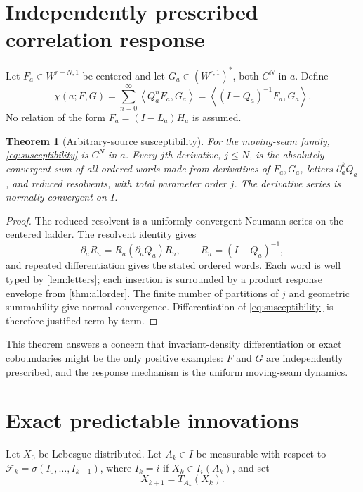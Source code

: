 \documentclass[11pt,reqno]{amsart}
\newtheorem{theorem}{Theorem}[section]
\theoremstyle{definition}
\theoremstyle{remark}
\newcommand{\F}{\mathcal F}
\newcommand{\pair}[2]{\left\langle #1,#2\right\rangle}
\begin{document}
\section{Independently prescribed correlation response}

Let $F_a\in W^{r+N,1}$ be centered and let
$G_a\in(W^{r,1})^*$, both $C^N$ in $a$.  Define
\begin{equation}\label{eq:susceptibility}
 \chi(a;F,G)=
 \sum_{n=0}^\infty\pair{Q_a^nF_a}{G_a}
 =\pair{(I-Q_a)^{-1}F_a}{G_a}.
\end{equation}
No relation of the form $F_a=(I-L_a)H_a$ is assumed.

\begin{theorem}[Arbitrary-source susceptibility]\label{thm:correlation}
For the moving-seam family, \eqref{eq:susceptibility} is $C^N$ in $a$.  Every
$j$th derivative, $j\le N$, is the absolutely convergent sum of all ordered
words made from derivatives of $F_a,G_a$, letters
$\partial_a^kQ_a$, and reduced resolvents, with total parameter order $j$.
The derivative series is normally convergent on $I$.
\end{theorem}

\begin{proof}
The reduced resolvent is a uniformly convergent Neumann series on the centered
ladder.  The resolvent identity gives
\[
 \partial_aR_a=R_a(\partial_aQ_a)R_a,
 \qquad R_a=(I-Q_a)^{-1},
\]
and repeated differentiation gives the stated ordered words.  Each word is
well typed by \cref{lem:letters}; each insertion is surrounded by a product
response envelope from \cref{thm:allorder}.  The finite number of partitions
of $j$ and geometric summability give normal convergence.  Differentiation of
\eqref{eq:susceptibility} is therefore justified term by term.
\end{proof}

This theorem answers a concern that invariant-density differentiation or exact
coboundaries might be the only positive examples: $F$ and $G$ are independently
prescribed, and the response mechanism is the uniform moving-seam dynamics.

\section{Exact predictable innovations}

Let $X_0$ be Lebesgue distributed.  Let
$A_k\in I$ be measurable with respect to
$\F_k=\sigma(I_0,\ldots,I_{k-1})$, where
$I_k=i$ if $X_k\in I_i(A_k)$, and set
\[
 X_{k+1}=T_{A_k}(X_k).
\]
\end{document}
